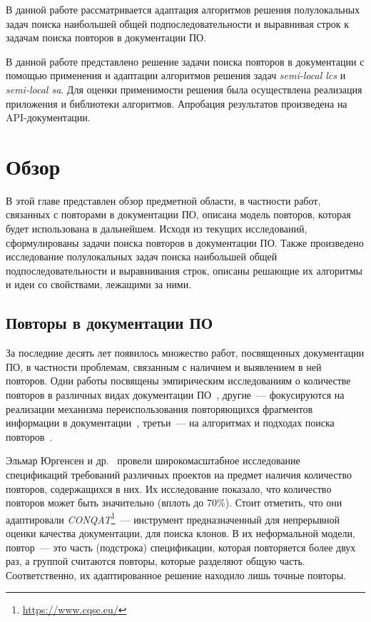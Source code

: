 В данной работе рассматривается адаптация алгоритмов решения полулокальных задач  поиска наибольшей общей подпоследовательности и выравнивая строк к задачам поиска повторов в документации ПО.



В данной работе представлено решение задачи поиска повторов в документации с помощью применения и адаптации алгоритмов решения задач \emph{semi-local lcs} и \emph{semi-local sa}. Для оценки применимости решения была осуществлена реализация приложения и библиотеки алгоритмов. Апробация результатов произведена на API-документации.



\section{Обзор}
В этой главе представлен обзор предметной области, в частности работ, связанных с повторами в документации ПО, описана модель повторов, которая будет использована в дальнейшем. 
Исходя из текущих исследований, сформулированы задачи поиска повторов в документации ПО.
Также произведено исследование полулокальных задач поиска наибольшей общей подпоследовательности и выравнивания строк, описаны решающие их алгоритмы и идеи со свойствами, лежащими за ними.

\subsection{Повторы в документации ПО}\label{duplicateReport}

За последние десять лет появилось множество работ, посвященных документации ПО, в частности проблемам, связанным с наличием и выявлением в ней повторов.
Одни работы посвящены эмпирическим исследованиям о количестве повторов  в различных видах документации ПО~\cite{poruban2016preliminary,juergens2010can,oumaziz2017documentation}, другие~--- фокусируются на реализации механизма переиспользования повторяющихся фрагментов информации в документации~\cite{koznov2015clone,horie2010tool,poruban2014reusable}, третьи~--- на алгоритмах и подходах поиска повторов~\cite{luciv2018detecting,luciv2019interactive,blasi2018replicomment,rago2016identifying, soto2015similarity}.

Эльмар Юргенсен и др.~\cite{juergens2010can} провели широкомасштабное исследование спецификаций требований различных проектов на предмет наличия количество повторов, содержащихся в них. 
Их исследование показало, что количество повторов может быть значительно (вплоть до 70\%). 
Стоит отметить, что они адаптировали \emph{CONQAT}\footnote{\url{https://www.cqse.eu/}}~--- инструмент предназначенный для непрерывной оценки качества документации, для поиска клонов.
В их неформальной модели, повтор~--- это часть (подстрока) спецификации, которая повторяется более двух раз, а группой считаются повторы, которые разделяют общую часть. 
Соответственно, их адаптированное решение находило лишь точные повторы.

